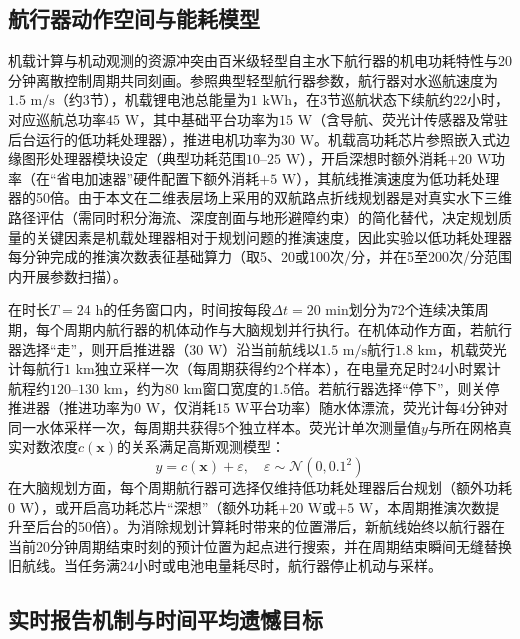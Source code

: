 \subsection{航行器动作空间与能耗模型}

机载计算与机动观测的资源冲突由百米级轻型自主水下航行器的机电功耗特性与20分钟离散控制周期共同刻画。参照典型轻型航行器参数\cite{remus100}，航行器对水巡航速度为$1.5\text{ m/s}$（约3节），机载锂电池总能量为$1\text{ kWh}$，在3节巡航状态下续航约22小时，对应巡航总功率$45\text{ W}$，其中基础平台功率为$15\text{ W}$（含导航、荧光计传感器及常驻后台运行的低功耗处理器），推进电机功率为$30\text{ W}$。机载高功耗芯片参照嵌入式边缘图形处理器模块设定（典型功耗范围$10\text{--}25\text{ W}$）\cite{jetsonorinnx}，开启深想时额外消耗$+20\text{ W}$功率（在“省电加速器”硬件配置下额外消耗$+5\text{ W}$），其航线推演速度为低功耗处理器的50倍。由于本文在二维表层场上采用的双航路点折线规划器是对真实水下三维路径评估（需同时积分海流、深度剖面与地形避障约束）的简化替代，决定规划质量的关键因素是机载处理器相对于规划问题的推演速度，因此实验以低功耗处理器每分钟完成的推演次数表征基础算力（取5、20或100次/分，并在5至200次/分范围内开展参数扫描）。

在时长$T=24\text{ h}$的任务窗口内，时间按每段$\Delta t = 20\text{ min}$划分为72个连续决策周期，每个周期内航行器的机体动作与大脑规划并行执行\cite{xiao2020thinking, elboher2023formal}。在机体动作方面，若航行器选择“走”，则开启推进器（$30\text{ W}$）沿当前航线以$1.5\text{ m/s}$航行$1.8\text{ km}$，机载荧光计每航行$1\text{ km}$独立采样一次（每周期获得约2个样本），在电量充足时24小时累计航程约$120\text{--}130\text{ km}$，约为$80\text{ km}$窗口宽度的1.5倍。若航行器选择“停下”，则关停推进器（推进功率为$0\text{ W}$，仅消耗$15\text{ W}$平台功率）随水体漂流，荧光计每4分钟对同一水体采样一次，每周期共获得5个独立样本。荧光计单次测量值$y$与所在网格真实对数浓度$c(\mathbf{x})$的关系满足高斯观测模型：
\begin{equation}
  y = c(\mathbf{x}) + \varepsilon, \quad \varepsilon \sim \mathcal{N}(0, 0.1^2)
  \label{eq:obs}
\end{equation}
在大脑规划方面，每个周期航行器可选择仅维持低功耗处理器后台规划（额外功耗$0\text{ W}$），或开启高功耗芯片“深想”（额外功耗$+20\text{ W}$或$+5\text{ W}$，本周期推演次数提升至后台的50倍）。为消除规划计算耗时带来的位置滞后，新航线始终以航行器在当前20分钟周期结束时刻的预计位置为起点进行搜索，并在周期结束瞬间无缝替换旧航线。当任务满24小时或电池电量耗尽时，航行器停止机动与采样。

\subsection{实时报告机制与时间平均遗憾目标}

